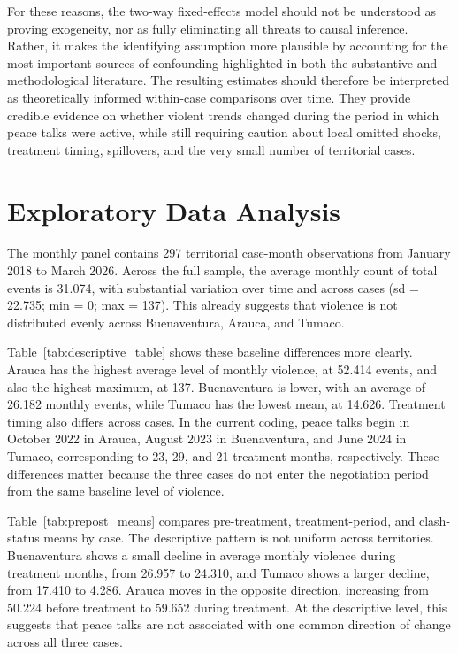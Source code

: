 \documentclass[11pt]{article}
\begin{document}
For these reasons, the two-way fixed-effects model should not be understood as proving exogeneity, nor as fully eliminating all threats to causal inference. Rather, it makes the identifying assumption more plausible by accounting for the most important sources of confounding highlighted in both the substantive and methodological literature. The resulting estimates should therefore be interpreted as theoretically informed within-case comparisons over time. They provide credible evidence on whether violent trends changed during the period in which peace talks were active, while still requiring caution about local omitted shocks, treatment timing, spillovers, and the very small number of territorial cases.

\section{Exploratory Data Analysis}\label{exploratory-data-analysis}

The monthly panel contains 297 territorial case-month observations from January 2018 to March 2026. Across the full sample, the average monthly count of total events is 31.074, with substantial variation over time and across cases (sd = 22.735; min = 0; max = 137). This already suggests that violence is not distributed evenly across Buenaventura, Arauca, and Tumaco.

{\small\setlength{\tabcolsep}{4pt}}

Table~\ref{tab:descriptive_table} shows these baseline differences more clearly. Arauca has the highest average level of monthly violence, at 52.414 events, and also the highest maximum, at 137. Buenaventura is lower, with an average of 26.182 monthly events, while Tumaco has the lowest mean, at 14.626. Treatment timing also differs across cases. In the current coding, peace talks begin in October 2022 in Arauca, August 2023 in Buenaventura, and June 2024 in Tumaco, corresponding to 23, 29, and 21 treatment months, respectively. These differences matter because the three cases do not enter the negotiation period from the same baseline level of violence.

{\small\setlength{\tabcolsep}{4pt}}

Table~\ref{tab:prepost_means} compares pre-treatment, treatment-period, and clash-status means by case. The descriptive pattern is not uniform across territories. Buenaventura shows a small decline in average monthly violence during treatment months, from 26.957 to 24.310, and Tumaco shows a larger decline, from 17.410 to 4.286. Arauca moves in the opposite direction, increasing from 50.224 before treatment to 59.652 during treatment. At the descriptive level, this suggests that peace talks are not associated with one common direction of change across all three cases.
\end{document}
